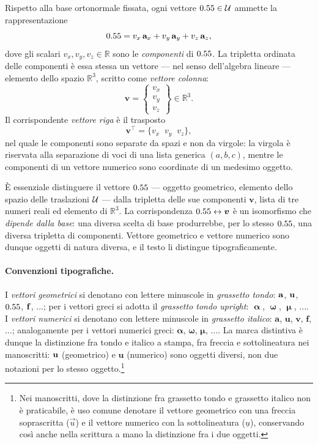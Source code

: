 Rispetto alla base ortonormale fissata, ogni vettore $0.55 \in \mathcal{U}$ 
ammette la rappresentazione
\begin{equation}
	0.55 = v_x\,\mathbf{a}_x + v_y\,\mathbf{a}_y + v_z\,\mathbf{a}_z,
\end{equation}
dove gli scalari $v_x, v_y, v_z \in \mathbb{R}$ sono le 
\textit{componenti} di $0.55$. La tripletta ordinata delle componenti 
è essa stessa un vettore --- nel senso dell'algebra lineare --- 
elemento dello spazio $\mathbb{R}^3$, scritto come \textit{vettore 
	colonna}:
\begin{equation}
	\bm{v} = \begin{Bmatrix} v_x \\ v_y \\ v_z \end{Bmatrix} 
	\in \mathbb{R}^3.
\end{equation}
Il corrispondente \textit{vettore riga} è il trasposto
\begin{equation}
	\bm{v}^\top = \{ v_x \;\; v_y \;\; v_z \},
\end{equation}
nel quale le componenti sono separate da spazi e non da virgole: 
la virgola è riservata alla separazione di voci di una lista 
generica $(a, b, c)$, mentre le componenti di un vettore numerico 
sono coordinate di un medesimo oggetto.

È essenziale distinguere il vettore $0.55$ --- oggetto geometrico, 
elemento dello spazio delle traslazioni $\mathcal{U}$ --- dalla tripletta 
delle sue componenti $\bm{v}$, lista di tre numeri reali ed 
elemento di $\mathbb{R}^3$. La corrispondenza $0.55 \leftrightarrow 
\bm{v}$ è un isomorfismo che \textit{dipende dalla base}: una diversa 
scelta di base produrrebbe, per lo stesso $0.55$, una diversa 
tripletta di componenti. Vettore geometrico e vettore numerico 
sono dunque oggetti di natura diversa, e il testo li distingue 
tipograficamente.

\paragraph{Convenzioni tipografiche.}
I \textit{vettori geometrici} si denotano con lettere minuscole 
in \textit{grassetto tondo}: $\mathbf{a}$, $\mathbf{u}$, $0.55$, $\mathbf{f}$, 
$\ldots$; per i vettori greci si adotta il \textit{grassetto 
	tondo upright}: $\bm{\upalpha}$, $\bm{\upomega}$, $\bm{\upmu}$, 
$\ldots$. I \textit{vettori numerici} si denotano con lettere 
minuscole in \textit{grassetto italico}: $\bm{a}$, $\bm{u}$, 
$\bm{v}$, $\bm{f}$, $\ldots$; analogamente per i vettori 
numerici greci: $\bm{\alpha}$, $\bm{\omega}$, $\bm{\mu}$, 
$\ldots$. La marca distintiva è dunque la distinzione fra 
tondo e italico a stampa, fra freccia e sottolineatura nei 
manoscritti: $\mathbf{u}$ (geometrico) e $\bm{u}$ (numerico) sono 
oggetti diversi, non due notazioni per lo stesso 
oggetto.\footnote{Nei manoscritti, dove la distinzione fra 
	grassetto tondo e grassetto italico non è praticabile, è uso 
	comune denotare il vettore geometrico con una freccia 
	soprascritta ($\overrightarrow{u}$) e il vettore numerico con 
	la sottolineatura ($\underline{u}$), conservando così anche 
	nella scrittura a mano la distinzione fra i due oggetti.}

